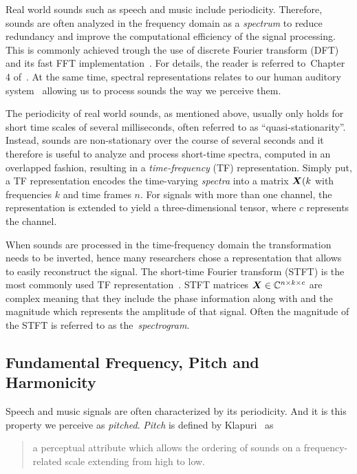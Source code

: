 Real world sounds such as speech and music include periodicity.
Therefore, sounds are often analyzed in the frequency domain as a \emph{spectrum} to reduce redundancy and improve the computational efficiency of the signal processing.
This is commonly achieved trough the use of discrete Fourier transform (DFT) and its fast FFT implementation~\cite{cooley65}. 
For details, the reader is referred to~Chapter 4 of~\cite{proakis96}.
At the same time, spectral representations relates to our human auditory system~\cite{zwicker13, moore89, bregman90} allowing us to process sounds the way we perceive them.
\par
The periodicity of real world sounds, as mentioned above, usually only holds for short time scales of several milliseconds, often referred to as ``quasi-stationarity''.
Instead, sounds are non-stationary over the course of several seconds and it therefore is useful to analyze and process short-time spectra, computed in an overlapped fashion, resulting in a \emph{time-frequency} (TF) representation.
Simply put, a TF representation encodes the time-varying \textit{spectra} into a matrix \({\bm{X}}(k\) with frequencies \(k\) and time frames \(n\).
For signals with more than one channel, the representation is extended to yield a three-dimensional tensor, where \(c\) represents the channel.
\par
When sounds are processed in the time-frequency domain the transformation needs to be inverted, hence many researchers chose a representation that allows to easily reconstruct the signal.
The short-time Fourier transform (STFT) is the most commonly used TF representation~\cite{mcaulay86}.
STFT matrices \({\bm{X}} \in {\mathbb{C}}^{n \times k \times c}\) are complex meaning that they include the phase information along with and the magnitude which represents the amplitude of that signal.
Often the magnitude of the STFT is referred to as the~\emph{spectrogram}.

\subsection{Fundamental Frequency, Pitch and Harmonicity}

Speech and music signals are often characterized by its periodicity.
And it is this property we perceive as \emph{pitched}.
\emph{Pitch} is defined by Klapuri~\cite{klapuri06book} as 

\begin{quote}
a perceptual attribute which allows the ordering of sounds on a frequency-related scale extending from high to low.
\end{quote}


